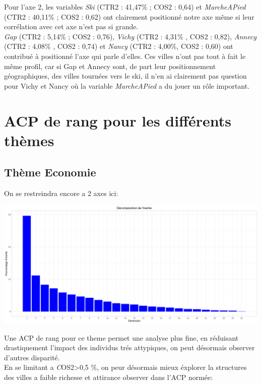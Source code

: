 \documentclass{article}
\begin{document}
Pour l'axe 2, les variables \emph{Ski} (CTR2 : 41,47\% ; COS2 : 0,64) et \emph{MarcheAPied} (CTR2 : 40,11\% ; COS2 : 0,62) ont clairement positionné notre axe même si leur corrélation avec cet axe n'est pas si grande. \\

\emph{Gap} (CTR2 : 5,14\% ; COS2 : 0,76), \emph{Vichy} (CTR2 : 4,31\% , COS2 : 0,82), \emph{Annecy} (CTR2 : 4,08\% , COS2 : 0,74) et \emph{Nancy} (CTR2 : 4,00\%, COS2 : 0,60) ont contribué à positionné l'axe qui parle d'elles. Ces villes n'ont pas tout à fait le même profil, car si Gap et Annecy sont, de part leur positionnement géographiques, des villes tournées vers le ski, il n'en ai clairement pas question pour Vichy et Nancy où la variable \emph{MarcheAPied} a du jouer un rôle important.

\section{ACP de rang pour les différents thèmes}
\subsection{Thème Economie}

On se restreindra encore a 2 axes ici:

\centerline{\includegraphics[width=0.5\linewidth]{images/VP2}}

Une ACP de rang pour ce theme permet une analyse plus fine, en réduisant drastiquement l'impact des individus trés attypiques, on peut désormais observer d'autres disparité.\\
En se limitant a \emph  COS2>0,5 \%, on peur désormais mieux éxplorer la structures des villes a faible richesse et attirance observer dans l'ACP normée:
\end{document}
